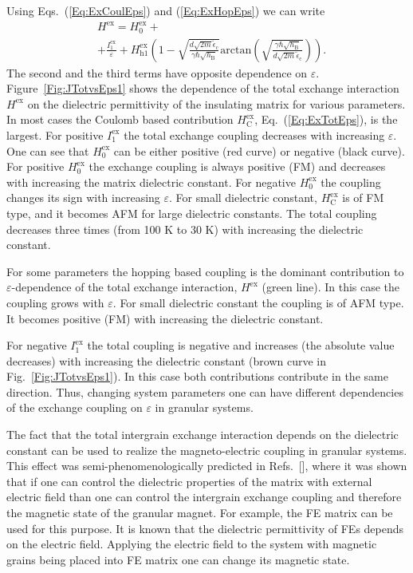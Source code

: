 \documentclass[aps,prb,amsmath,amssymb,twocolumn,superscriptaddress,showpacs,floatfix]{revtex4-1}
\begin{document}
Using Eqs.~(\ref{Eq:ExCoulEps}) and (\ref{Eq:ExHopEps}) we can write
\begin{equation}\label{Eq:ExTotEps}
\begin{split}
&H^\mathrm{ex}=H^\mathrm{ex}_{0}+\\
&+\frac{I^\mathrm{ex}_1}{\varepsilon}+H^\mathrm{ex}_{\mathrm h 1}\left(\!\!1-\sqrt{\frac{ d \sqrt{2m}\tilde\epsilon_{\mathrm c}}{\gamma\hbar\sqrt{h_\mathrm B}}}\mathrm{arctan}\left(\sqrt{\frac{\gamma\hbar\sqrt{h_\mathrm B}}{ d \sqrt{2m}\tilde\epsilon_{\mathrm c}}}\right)\!\!\right).
\end{split}
\end{equation}
The second and the third terms have opposite dependence on $\varepsilon$. Figure~\ref{Fig:JTotvsEps1} shows the dependence of the total exchange interaction $H^\mathrm{ex}$ on the dielectric permittivity of the insulating
matrix for various parameters. In most cases the Coulomb based contribution $H^\mathrm{ex}_\mathrm C$,
Eq.~(\ref{Eq:ExTotEps}), is
the largest. For positive $I^\mathrm{ex}_1$ the total exchange coupling
decreases with increasing $\varepsilon$. One can see that $H^\mathrm{ex}_{0}$
can be either positive (red curve) or negative (black curve). For positive $H^\mathrm{ex}_{0}$
the exchange coupling is always positive (FM) and decreases
with increasing the matrix dielectric constant. For negative $H^\mathrm{ex}_{0}$
the coupling changes its sign with increasing $\varepsilon$.
For small dielectric constant, $H^\mathrm{ex}_\mathrm C$ is of FM type, and it
becomes AFM for large dielectric constants. The total coupling decreases
three times (from 100 K to 30 K) with increasing the dielectric constant.

For some parameters the hopping based coupling is the dominant
contribution to $\varepsilon$-dependence of the total exchange interaction, $H^\mathrm{ex}$ (green line).
In this case the coupling grows with $\varepsilon$. For small
dielectric constant the coupling is of AFM type. It becomes positive (FM)
with increasing the dielectric constant.


For negative $I^\mathrm{ex}_1$ the total coupling is negative
and increases (the absolute value decreases)
with increasing the dielectric constant (brown curve in Fig.~\ref{Fig:JTotvsEps1}).
In this case both contributions contribute in the same direction.
Thus, changing system parameters one can have different dependencies
of the exchange coupling on $\varepsilon$ in granular systems.

The fact that the total intergrain exchange interaction depends
on the dielectric constant can be used to realize the magneto-electric
coupling in granular systems. This effect was semi-phenomenologically predicted in Refs.~[], where it was shown that
if one can control the dielectric properties of the matrix with external
electric field than one can control the intergrain exchange coupling
and therefore the magnetic state of the granular magnet.
For example, the FE matrix can be used for this purpose.
It is known that the dielectric permittivity of FEs depends
on the electric field. Applying the electric field to the system
with magnetic grains being placed into FE matrix one can
change its magnetic state.
\end{document}
